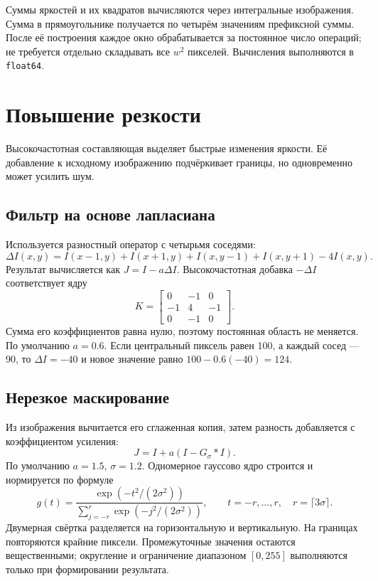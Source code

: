 \documentclass[12pt,a4paper]{extarticle}
\newcommand{\code}[1]{\texttt{\small #1}}
\begin{document}
Суммы яркостей и их квадратов вычисляются через интегральные изображения. Сумма в прямоугольнике получается по четырём значениям префиксной суммы. После её построения каждое окно обрабатывается за постоянное число операций; не требуется отдельно складывать все $w^2$ пикселей. Вычисления выполняются в \code{float64}.

\clearpage
\section{Повышение резкости}
Высокочастотная составляющая выделяет быстрые изменения яркости. Её добавление к исходному изображению подчёркивает границы, но одновременно может усилить шум.

\subsection{Фильтр на основе лапласиана}
Используется разностный оператор с четырьмя соседями:
\begin{equation}
 \Delta I(x,y)=I(x-1,y)+I(x+1,y)+I(x,y-1)+I(x,y+1)-4I(x,y).
\end{equation}
Результат вычисляется как $J=I-a\Delta I$. Высокочастотная добавка $-\Delta I$ соответствует ядру
\begin{equation}
 K=\begin{bmatrix}0&-1&0\\-1&4&-1\\0&-1&0\end{bmatrix}.
\end{equation}
Сумма его коэффициентов равна нулю, поэтому постоянная область не меняется. По умолчанию $a=0.6$. Если центральный пиксель равен 100, а каждый сосед --- 90, то $\Delta I=-40$ и новое значение равно $100-0.6(-40)=124$.

\subsection{Нерезкое маскирование}
Из изображения вычитается его сглаженная копия, затем разность добавляется с коэффициентом усиления:
\begin{equation}
 J=I+a(I-G_\sigma*I).
\end{equation}
По умолчанию $a=1.5$, $\sigma=1.2$. Одномерное гауссово ядро строится и нормируется по формуле
\begin{equation}
 g(t)=\frac{\exp(-t^2/(2\sigma^2))}{\sum_{j=-r}^{r}\exp(-j^2/(2\sigma^2))},
 \qquad t=-r,\ldots,r,\quad r=\lceil3\sigma\rceil.
\end{equation}
Двумерная свёртка разделяется на горизонтальную и вертикальную. На границах повторяются крайние пиксели. Промежуточные значения остаются вещественными; округление и ограничение диапазоном $[0,255]$ выполняются только при формировании результата.
\end{document}
